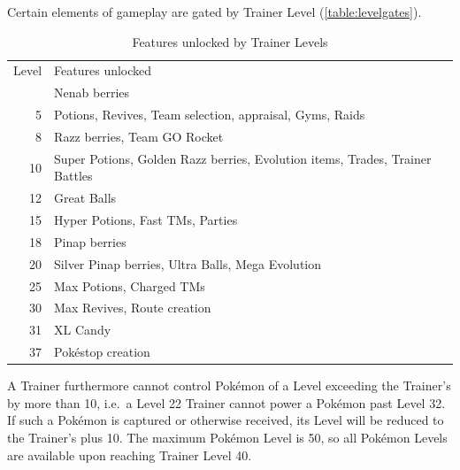 Certain elements of gameplay are gated by Trainer Level (\autoref{table:levelgates}).
\begin{table}[ht]
\begin{center}
  \begin{tabular}{r p{}}
  Level & Features unlocked \\
\Midrule
  2 & Nenab berries \\
  5 & Potions, Revives, Team selection, appraisal, Gyms, Raids \\
  8 & Razz berries, Team GO Rocket \\
  10 & Super Potions, Golden Razz berries, Evolution items, Trades, Trainer Battles \\
  12 & Great Balls \\
  15 & Hyper Potions, Fast TMs, Parties \\
  18 & Pinap berries \\
  20 & Silver Pinap berries, Ultra Balls, Mega Evolution \\
  25 & Max Potions, Charged TMs \\
  30 & Max Revives, Route creation \\
  31 & XL Candy \\
  37 & Pokéstop creation \\
\end{tabular}
\caption{Features unlocked by Trainer Levels}
\label{table:levelgates}
\end{center}
\end{table}
A Trainer furthermore cannot control Pokémon of a Level exceeding the Trainer's by more than 10,
  i.e.\ a Level 22 Trainer cannot power a Pokémon past Level 32.
If such a Pokémon is captured or otherwise received, its Level will be
  reduced to the Trainer's plus 10.
The maximum Pokémon Level is 50, so all Pokémon Levels are available upon
  reaching Trainer Level 40.

